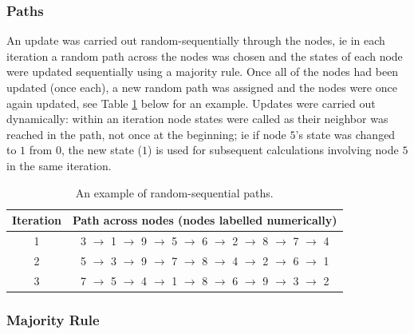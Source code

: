 \documentclass[a4paper, 10pt]{IEEEtran}
\begin{document}
\subsubsection{Paths}
\label{subsub:paths}

An update was carried out random-sequentially through the nodes, ie in each iteration a random path across the nodes was chosen and the states of each node were updated sequentially using a majority rule. Once all of the nodes had been updated (once each), a new random path was assigned and the nodes were once again updated, see Table \ref{tab:paths} below for an example. Updates were carried out dynamically: within an iteration node states were called as their neighbor was reached in the path, not once at the beginning; ie if node $5$'s state was changed to $1$ from $0$, the new state ($1$) is used for subsequent calculations involving node $5$ in the same iteration.

\begin{center} %
	\begin{minipage}{.7\linewidth} %
	\begin{table}[H]
		\centering %
		\renewcommand{\arraystretch}{1.3} %
		\caption{An example of random-sequential paths.}
		\label{tab:paths}
		\begin{tabular}{c | c} %
			Iteration & Path across nodes (nodes labelled numerically) \\ \hline \hline %
			1 & 3 $\rightarrow$ 1 $\rightarrow$ 9 $\rightarrow$ 5 $\rightarrow$ 6 $\rightarrow$ 2 $\rightarrow$ 8 $\rightarrow$ 7 $\rightarrow$ 4 \\ \hline
			2 & 5 $\rightarrow$ 3 $\rightarrow$ 9 $\rightarrow$ 7 $\rightarrow$ 8 $\rightarrow$ 4 $\rightarrow$ 2 $\rightarrow$ 6 $\rightarrow$ 1 \\ \hline
			3 & 7 $\rightarrow$ 5 $\rightarrow$ 4 $\rightarrow$ 1 $\rightarrow$ 8 $\rightarrow$ 6 $\rightarrow$ 9 $\rightarrow$ 3 $\rightarrow$ 2 \\ \hline
		\end{tabular}
	\end{table}
	\end{minipage}
\end{center}


\subsubsection{Majority Rule}
\label{subsub:majority}
\end{document}
